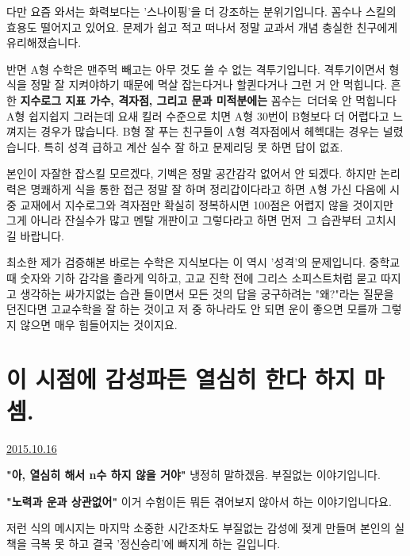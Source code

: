 다만 요즘 와서는 화력보다는 '스나이핑'을 더 강조하는 분위기입니다.
꼼수나 스킬의 효용도 떨어지고 있어요. 문제가 쉽고 적고 떠나서 정말 교과서 개념 충실한 친구에게 유리해졌습니다.
\vspace{5mm}

반면 A형 수학은 맨주먹 빼고는 아무 것도 쓸 수 없는 격투기입니다.
격투기이면서 형식을 정말 잘 지켜야하기 때문에 멱살 잡는다거나 할퀸다거나 그런 거 안 먹힙니다.
흔한 \textbf{지수로그 지표 가수, 격자점, 그리고 문과 미적분에는} 꼼수는 더더욱 안 먹힙니다
A형 쉽지쉽지 그러는데 요새 킬러 수준으로 치면 A형 30번이 B형보다 더 어렵다고 느껴지는 경우가 많습니다.
B형 잘 푸는 친구들이 A형 격자점에서 헤헥대는 경우는 널렸습니다. 특히 성격 급하고 계산 실수 잘 하고 문제리딩 못 하면 답이 없죠.
\vspace{5mm}

본인이 자잘한 잡스킬 모르겠다, 기벡은 정말 공간감각 없어서 안 되겠다.
하지만 논리력은 명쾌하게 식을 통한 접근 정말 잘 하며 정리갑이다라고 하면 A형 가신 다음에
시중 교재에서 지수로그와 격자점만 확실히 정복하시면 100점은 어렵지 않을 것이지만
그게 아니라 잔실수가 많고 멘탈 개판이고 그렇다라고 하면 먼저 그 습관부터 고치시길 바랍니다.
\vspace{5mm}

최소한 제가 검증해본 바로는 수학은 지식보다는 이 역시 '성격'의 문제입니다.
중학교 때 숫자와 기하 감각을 졸라게 익하고, 고교 진학 전에 그리스 소피스트처럼 묻고 따지고 생각하는 싸가지없는 습관 들이면서
모든 것의 답을 궁구하려는 "왜?"라는 질문을 던진다면 고교수학을 잘 하는 것이고
저 중 하나라도 안 되면 운이 좋으면 모를까 그렇지 않으면 매우 힘들어지는 것이지요.
\vspace{5mm}






\section{이 시점에 감성파든 열심히 한다 하지 마셈.}
\href{https://www.kockoc.com/Apoc/418857}{2015.10.16}

\vspace{5mm}

\textbf{"아, 열심히 해서 n수 하지 않을 거야"}
냉정히 말하겠음. 부질없는 이야기입니다.
\vspace{5mm}

\textbf{"노력과 운과 상관없어"}
이거 수험이든 뭐든 겪어보지 않아서 하는 이야기입니다요.
\vspace{5mm}

저런 식의 메시지는 마지막 소중한 시간조차도 부질없는 감성에 젖게 만들며
본인의 실책을 극복 못 하고 결국 '정신승리'에 빠지게 하는 길입니다.
\vspace{5mm}

